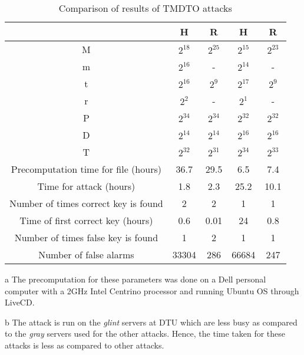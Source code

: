 \begin{table}[ht!]
\begin{center}
\caption{Comparison of results of TMDTO attacks}
\smallskip
\smallskip
\begin{threeparttable}
\begin{tabular}{|c|c c||c c|}
\hline
																				&	H							&	R								&	H								& R							\\ \hline \hline
M																				&	$2^{18}$			&	$2^{25}$				&	$2^{15}$				& $2^{23}$			\\ \hline 
m																				&	$2^{16}$			&		-							&	$2^{14}$				& 	-						\\ \hline 
t																				&	$2^{16}$			&	$2^{9}$					&	$2^{17}$				& $2^{9}$				\\ \hline 
r																				&	$2^{2}$				&		-							&	$2^{1}$					& 	-						\\ \hline 
P																				&	$2^{34}$			&	$2^{34}$				&	$2^{32}$				& $2^{32}$			\\ \hline 
D																				&	$2^{14}$			&	$2^{14}$				&	$2^{16}$				& $2^{16}$			\\ \hline \hline
T																				&	$2^{32}$			&	$2^{31}$				&	$2^{34}$				& $2^{33}$			\\ \hline \hline
Precomputation time for file (hours)		&	36.7 \tnote{a}&	29.5						&	6.5							&	7.4						\\ \hline
Time for attack	(hours)									&	1.8	 \tnote{b}&	2.3							&	25.2						&	10.1					\\ \hline
Number of times correct key is found 		&	2 	 					&	2 							&	1 							&	1 						\\ \hline
Time of first correct key (hours)				&	0.6	 					&	0.01						&	24							&	0.8						\\ \hline
Number of times false key is found			&	1 	 					&	2 							&	1 							&	1 						\\ \hline
Number of false alarms									&	33304					&	286							&	66684						&	247						\\ \hline
\end{tabular}
\smallskip
\begin{tablenotes}
	\item[a] The precomputation for these parameters was done on a Dell personal computer with a 2GHz Intel Centrino processor and running Ubuntu OS through LiveCD.
	\item[b] The attack is run on the \textit{glint} servers at DTU which are less busy as compared to the \textit{gray} servers used for the other attacks. Hence, the time taken for these attacks is less as compared to other attacks.
\end{tablenotes}
\end{threeparttable}
\end{center} 
\label{tab:comparison-results-hellman-rainbow}
\end{table}

